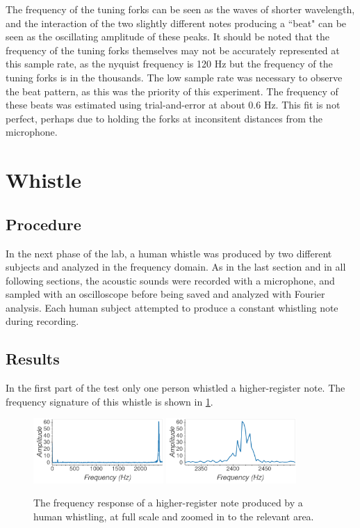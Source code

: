 \documentclass[aps,prl,reprint]{revtex4-2}
\begin{document}
The frequency of the tuning forks can be seen as the waves of shorter wavelength,
and the interaction of the two slightly different notes producing a ``beat" can
be seen as the oscillating amplitude of these peaks. It should be noted that
the frequency of the tuning forks themselves may not be accurately represented
at this sample rate, as the nyquist frequency is 120 Hz but the frequency of
the tuning forks is in the thousands. The low sample rate was necessary to observe
the beat pattern, as this was the priority of this experiment. The frequency of these
beats was estimated using trial-and-error at about 0.6 Hz. This fit is not
perfect, perhaps due to holding the forks at inconsitent distances from the
microphone. 

\section{Whistle}

\subsection{Procedure}

In the next phase of the lab, a human whistle was produced by two different
subjects and analyzed in the frequency domain. As in the last section and
in all following sections, the acoustic sounds were recorded with a microphone,
and sampled with an oscilloscope before being saved and analyzed with Fourier
analysis. Each human subject attempted to produce a constant whistling note
during recording.

\subsection{Results}

In the first part of the test only one person whistled a higher-register note.
The frequency signature of this whistle is shown in \ref{high}.

\begin{figure}[h]
\includegraphics[width=0.44\textwidth]{../Images/l5_D_1.png}
\includegraphics[width=0.44\textwidth]{../Images/l5_D_1_zoomed.png}
\caption{\label{high} The frequency response of a higher-register note
produced by a human whistling, at full scale and zoomed in to the relevant area.}
\end{figure}
\end{document}
